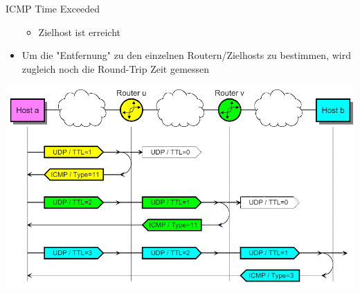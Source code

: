 \begin{definition}{ICMP Time Exceeded}
\begin{itemize}
\begin{itemize}
            \item Zielhost ist erreicht
        \end{itemize}
        \item Um die "Entfernung" zu den einzelnen Routern/Zielhosts zu bestimmen, wird zugleich noch die Round-Trip Zeit gemessen
    \end{itemize}
        \includegraphics[width=1\linewidth]{images/traceroute.png}
\end{definition}











